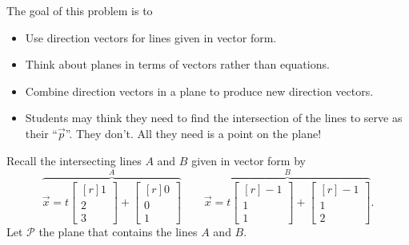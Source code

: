 \documentclass{problemset}
\newcommand{\mat}[1]{\begin{bmatrix*}[r]#1\end{bmatrix*}}
\begin{document}
	\question
	\begin{annotation}
		\begin{goals}

			The goal of this problem is to
			\begin{itemize}
				\item Use direction vectors for lines given in vector form.
				\item Think about planes in terms of vectors rather
					than equations.
				\item Combine direction vectors in a plane to produce new direction vectors.
			\end{itemize}
		\end{goals}

		\begin{notes}
			\begin{itemize}
				\item Students may think they need to find the intersection
					of the lines to serve as their ``$\vec p$''.
					They don't. All they need is a point
					on the plane!
			\end{itemize}
		\end{notes}
	\end{annotation}
	Recall the intersecting lines $A$ and $B$ given in vector form by
	\[
		\overbrace{\vec x=t\mat{1\\2\\3}+\mat{0\\0\\1}}^{\displaystyle A}
		\qquad
		\overbrace{\vec x=t\mat{-1\\1\\1}+\mat{-1\\1\\2}}^{\displaystyle B}.
	\]
	Let $\mathcal P$ the plane that contains the lines $A$ and $B$.
\end{document}
